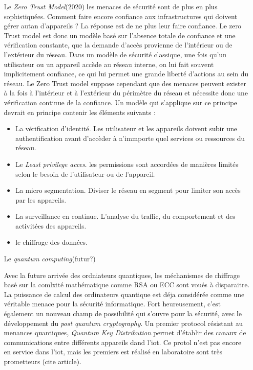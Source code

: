 Le \textit{Zero Trust Model}(2020) 
les menaces de sécurité sont de plus en plus sophistiquées. Comment faire encore confiance aux infrastructures qui doivent gérer autan d'appareils ? La réponse est de ne plus leur faire confiance. Le zero Trust model est donc un modèle basé sur l'absence totale de confiance et une vérification constante, que la demande d'accès provienne de l'intérieur ou de l'extérieur du réseau. Dans un modèle de sécurité classique, une fois qu'un utilisateur ou un appareil accède au réseau interne, on lui fait souvent implicitement confiance, ce qui lui permet une grande liberté d'actions au sein du réseau. Le Zero Trust model suppose cependant que des menaces peuvent exister à la fois à l’intérieur et à l’extérieur du périmètre du réseau et nécessite donc une vérification continue de la confiance. Un modèle qui s'applique sur ce principe devrait en principe contenir les éléments suivants :
\begin{itemize}
\item La vérification d'identité. Les utilisateur et les appareils doivent subir une authentification avant d'accèder à n'immporte quel services ou ressources du réseau.
\item Le \textit{Least privilege acces}. les permissions sont accordées de manières limités selon le besoin de l'utilisateur ou de l'appareil.
\item La micro segmentation. Diviser le réseau en segment pour limiter son accès par les appareils.
\item La surveillance en continue. L'analyse du traffic, du comportement et des activitées des appareils.
\item le chiffrage des données.
\end{itemize}

Le \textit{quantum computing}(futur?)

Avec la future arrivée des ordniateurs quantiques, les méchanismes de chiffrage basé sur la comlxité mathématique comme RSA ou ECC sont voués à disparaitre. La puissance de calcul des ordinateurs quantique est déja considérée comme une véritable menace pour la sécurité informatique. Fort heureusement, c'est également un nouveau champ de possibilité qui s'ouvre pour la sécurité, avec le développement du \textit{post quantum cryptography}. Un premier protocol résistant au menances quantiques, \textit{Quantum Key Distribution} permet d'établir des canaux de communications entre différents appareils dand l'iot. Ce protol n'est pas encore en service dans l'iot, mais les premiers est réalisé en laboratoire sont très prometteurs (cite article).

